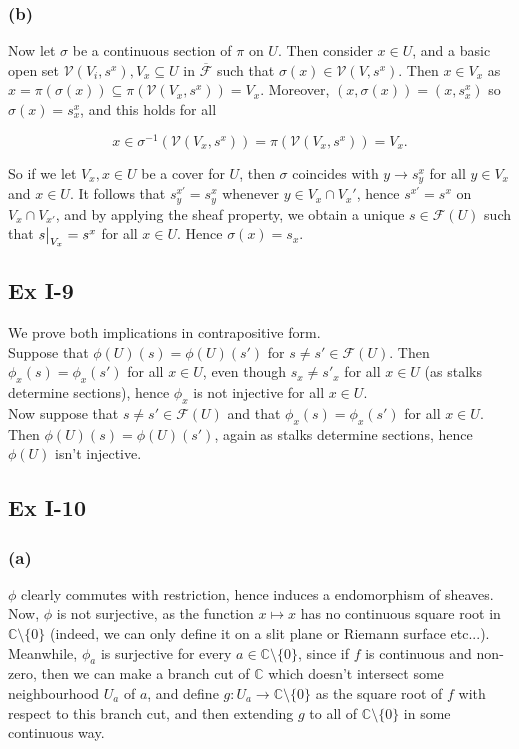 \documentclass{article}
\newcommand\restr[2]{{%
  \left.\kern-\nulldelimiterspace %
  #1 %
  \vphantom{\big|} %
  \right|_{#2} %
  }}
\theoremstyle{definition}
\newcommand{\C}{\mathbb{C}}
\begin{document}
\subsubsection*{(b)}

Now let $\sigma$ be a continuous section of $\pi$ on $U$. Then consider $x \in
U$, and a basic open set $\mathscr{V}(V_i, s^x), V_x \subseteq U$ in
$\overline{\mathscr{F}}$ such that $\sigma(x) \in \mathscr{V}(V, s^x)$. Then $x
\in V_x$ as $x = \pi(\sigma(x)) \subseteq \pi(\mathscr{V}(V_x, s^x)) = V_x$.
Moreover, $(x, \sigma(x)) = (x, s^x_x)$ so $\sigma(x) = s^x_x$, and this holds
for all 

\[
	x 
	\in 
	\sigma^{-1}(\mathscr{V}(V_x, s^x)) 
	= 
	\pi(\mathscr{V}(V_x, s^x))
	= 
	V_x.
\]

So if we let $V_x, x \in U$ be a cover for $U$, then $\sigma$ coincides with $y
\to s^x_y$ for all $y \in V_x$ and $x \in U$. It follows that $s^{x'}_y =
s^x_y$ whenever $y \in V_x \cap V_x'$, hence $s^{x'} = s^x$ on $V_x \cap
V_{x'}$, and by applying the sheaf property, we obtain a unique $s \in
\mathscr{F}(U)$ such that $\restr{s}{V_x} = s^x$ for all $x \in U$. Hence
$\sigma(x) = s_x$.


\subsection*{Ex I-9}

We prove both implications in contrapositive form. \\

Suppose that $\phi(U)(s) = \phi(U)(s')$ for $s \not = s' \in \mathscr{F}(U)$.
Then $\phi_x(s) = \phi_x(s')$ for all $x \in U$, even though $s_x \not = s'_x$
for all $x \in U$ (as stalks determine sections), hence $\phi_x$ is not
injective for all $x \in U$. \\

Now suppose that $s \not = s' \in \mathscr{F}(U)$ and that $\phi_x(s) =
\phi_x(s')$ for all $x \in U$. Then $\phi(U)(s) = \phi(U)(s')$, again as stalks
determine sections, hence $\phi(U)$ isn't injective.


\subsection*{Ex I-10}
\subsubsection*{(a)}

$\phi$ clearly commutes with restriction, hence induces a endomorphism of
sheaves. Now, $\phi$ is not surjective, as the function $x \mapsto x$ has no
continuous square root in $\C \setminus \{0\}$ (indeed, we can only define it
on a slit plane or Riemann surface etc...). Meanwhile, $\phi_a$ is surjective
for every $a \in \C \setminus \{0\}$, since if $f$ is continuous and non-zero,
then we can make a branch cut of $\C$ which doesn't intersect some
neighbourhood $U_a$ of $a$, and define $g : U_a \to \C \setminus \{0\}$ as the
square root of $f$ with respect to this branch cut, and then extending $g$ to
all of $\C \setminus \{0\}$ in some continuous way.
\end{document}
